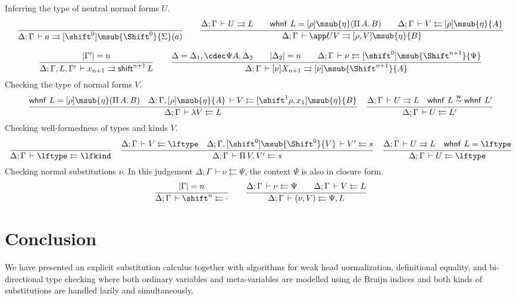 \documentclass[copyright,creativecommons]{eptcs}
\makeatletter
\newcommand{\der}{\,\vdash}
\newcommand{\length}[1]{|#1|}
\newcommand{\ru}[2]{\dfrac{\begin{array}[b]{@{}c@{}} #1 \end{array}}{#2}}
\newcommand{\shiftby}[1]{\shift^{#1}}
\newcommand{\Shiftby}[1]{\Shift^{#1}}
\newcommand{\mId}{\Shiftby 0}
\newcommand{\esub}[1]{[#1]}
\newcommand{\msubp}[2]{\msub{#1}(#2)}
\newcommand{\dsub}[3]{\esub{#1}{\msub{#2}{#3}}} \newcommand{\dsubp}[3]{\esub{#1}{\msubp{#2}{#3}}} \newcommand{\fun}[1]{\Pi\,#1.\,}
\newcommand{\alw}{\buildrel\mathsf{w}\over\sim}\newcommand{\Alw}{(\mathord{\alw})}
\newcommand{\twhnf}{\mathsf{whnf}}
\newcommand{\tshift}{\mathsf{shift}}
\newcommand{\shiftClos}[1]{\tshift^{#1}\,}
\newcommand{\sid}{\shiftby 0}
\newcommand{\jinf}{\rightrightarrows}
\newcommand{\jchk}{\leftleftarrows}
\newcommand{\cempty}{\mathord{\cdot}}
\makeatother
\begin{document}
\noindent
Inferring the type of neutral normal forms $U$.
\begin{gather*}
\ru{}{\Delta; \Gamma \der a \jinf \dsub \sid \mId \Sigma(a)}
\qquad 
  \ru{\Delta; \Gamma \der U \jinf L \qquad
      \twhnf~L = \dsubp \rho \eta {\fun A B} \qquad
      \Delta; \Gamma \der V \jchk \dsub \rho \eta A
    }{\Delta; \Gamma \der \app U V \jinf \dsub {\rho, V} \eta B}
\\[0.75em]
  \ru{\length{\Gamma'} = n
    }{\Delta; \Gamma, L, \Gamma' \der x_{n+1} \jinf 
\shiftClos {n+1} {L} 
      }
\qquad 
  \ru{\Delta = \Delta_1,\cdec \Psi A,\Delta_2 \qquad
      \length{\Delta_2} = n \qquad
\Delta; \Gamma \der \nu \jchk \dsub{\sid}{\Shiftby{n+1}}\Psi
    }{\Delta; \Gamma \der \esub \nu {X_{n+1}} \jinf 
        \dsub \nu {\Shiftby {n+1}} A} 
\end{gather*}
Checking the type of normal forms $V$.
\begin{gather*}
\ru{\twhnf~L = \dsubp \rho \eta {\fun A B} \quad
\Delta; \Gamma, \dsub \rho \eta A  \der V \jchk
         \dsub {\shiftby 1 \rho, x_1} \eta B
    }{\Delta; \Gamma \der \lambda V \jchk L}
\quad
\ru{\Delta; \Gamma \der U \jinf L \quad
      \twhnf~L \alw \twhnf~L'
    }{\Delta; \Gamma \der U \jchk L'}
\end{gather*}
Checking well-formedness of types and kinds $V$.
\begin{gather*}
\ru{}{\Delta; \Gamma \der \lftype \jchk \lfkind}
\quad
  \ru{\Delta; \Gamma \der V \jchk \lftype \quad
\Delta; \Gamma,  \dsub \sid \mId V \der V' \jchk s
    }{\Delta; \Gamma \der \fun V V' \jchk s} 
\quad
\ru{\Delta; \Gamma \der U \jinf L \quad
      \twhnf~L = \lftype
    }{\Delta; \Gamma \der U \jchk \lftype}
\end{gather*}
Checking normal substitutions $\nu$.  In this judgement $\Delta;
\Gamma \der \nu \jchk \Psi$, the context $\Psi$ is also in closure form. 
\begin{gather*}
  \ru{\length\Gamma = n
    }{\Delta; \Gamma \der \shiftby n \jchk \cempty}
\qquad
  \ru{\Delta; \Gamma \der \nu \jchk \Psi \qquad
      \Delta; \Gamma \der V \jchk L
    }{\Delta; \Gamma \der (\nu, V) \jchk \Psi,L}
\end{gather*}






\section{Conclusion}
We have presented an explicit substitution calculus together with
algorithms for weak head normalization, definitional equality, and
bi-directional type checking where both ordinary variables and
meta-variables are modelled using de Bruijn indices and both kinds of
substitutions are handled lazily and simultaneously. 
\end{document}
